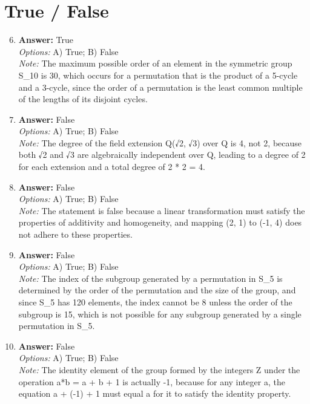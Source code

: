 \documentclass[12pt]{article}
\begin{document}
\section*{True / False}
\begin{enumerate}[label=\arabic*.]
\setcounter{enumi}{5}
\item \textbf{Answer:} True
\\ \textit{Options:} A) True; B) False
\\ \textit{Note:} The maximum possible order of an element in the symmetric group S\_10 is 30, which occurs for a permutation that is the product of a 5-cycle and a 3-cycle, since the order of a permutation is the least common multiple of the lengths of its disjoint cycles.
\item \textbf{Answer:} False
\\ \textit{Options:} A) True; B) False
\\ \textit{Note:} The degree of the field extension Q(√2, √3) over Q is 4, not 2, because both √2 and √3 are algebraically independent over Q, leading to a degree of 2 for each extension and a total degree of 2 * 2 = 4.
\item \textbf{Answer:} False
\\ \textit{Options:} A) True; B) False
\\ \textit{Note:} The statement is false because a linear transformation must satisfy the properties of additivity and homogeneity, and mapping (2, 1) to (-1, 4) does not adhere to these properties.
\item \textbf{Answer:} False
\\ \textit{Options:} A) True; B) False
\\ \textit{Note:} The index of the subgroup generated by a permutation in S\_5 is determined by the order of the permutation and the size of the group, and since S\_5 has 120 elements, the index cannot be 8 unless the order of the subgroup is 15, which is not possible for any subgroup generated by a single permutation in S\_5.
\item \textbf{Answer:} False
\\ \textit{Options:} A) True; B) False
\\ \textit{Note:} The identity element of the group formed by the integers Z under the operation a*b = a + b + 1 is actually -1, because for any integer a, the equation a + (-1) + 1 must equal a for it to satisfy the identity property.
\end{enumerate}
\end{document}
